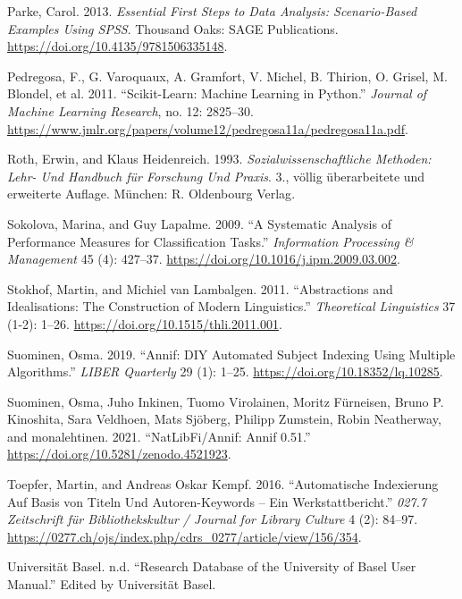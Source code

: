 \begin{CSLReferences}{1}{0}
\leavevmode\hypertarget{ref-Parke.2013}{}%
Parke, Carol. 2013. \emph{Essential First Steps to Data Analysis:
Scenario-Based Examples Using SPSS}. Thousand Oaks: {SAGE Publications}.
\url{https://doi.org/10.4135/9781506335148}.

\leavevmode\hypertarget{ref-Pedregosa.2011}{}%
Pedregosa, F., G. Varoquaux, A. Gramfort, V. Michel, B. Thirion, O.
Grisel, M. Blondel, et al. 2011. {``Scikit-Learn: Machine Learning in
Python.''} \emph{Journal of Machine Learning Research}, no. 12:
2825--30.
\url{https://www.jmlr.org/papers/volume12/pedregosa11a/pedregosa11a.pdf}.

\leavevmode\hypertarget{ref-Roth.1993}{}%
Roth, Erwin, and Klaus Heidenreich. 1993. \emph{Sozialwissenschaftliche
Methoden: Lehr- Und Handbuch f{ü}r Forschung Und Praxis}. 3., v{ö}llig
{ü}berarbeitete und erweiterte Auflage. M{ü}nchen: {R. Oldenbourg
Verlag}.

\leavevmode\hypertarget{ref-Sokolova.2009}{}%
Sokolova, Marina, and Guy Lapalme. 2009. {``A Systematic Analysis of
Performance Measures for Classification Tasks.''} \emph{Information
Processing {\&} Management} 45 (4): 427--37.
\url{https://doi.org/10.1016/j.ipm.2009.03.002}.

\leavevmode\hypertarget{ref-Stokhof.2011}{}%
Stokhof, Martin, and Michiel van Lambalgen. 2011. {``Abstractions and
Idealisations: The Construction of Modern Linguistics.''}
\emph{Theoretical Linguistics} 37 (1-2): 1--26.
\url{https://doi.org/10.1515/thli.2011.001}.

\leavevmode\hypertarget{ref-Suominen.2019}{}%
Suominen, Osma. 2019. {``Annif: DIY Automated Subject Indexing Using
Multiple Algorithms.''} \emph{LIBER Quarterly} 29 (1): 1--25.
\url{https://doi.org/10.18352/lq.10285}.

\leavevmode\hypertarget{ref-Suominen.2021}{}%
Suominen, Osma, Juho Inkinen, Tuomo Virolainen, Moritz Fürneisen, Bruno
P. Kinoshita, Sara Veldhoen, Mats Sjöberg, Philipp Zumstein, Robin
Neatherway, and monalehtinen. 2021. {``NatLibFi/Annif: Annif 0.51.''}
\url{https://doi.org/10.5281/zenodo.4521923}.

\leavevmode\hypertarget{ref-Toepfer.2016}{}%
Toepfer, Martin, and Andreas Oskar Kempf. 2016. {``Automatische
Indexierung Auf Basis von Titeln Und Autoren-Keywords -- Ein
Werkstattbericht.''} \emph{027.7 Zeitschrift f{ü}r Bibliothekskultur /
Journal for Library Culture} 4 (2): 84--97.
\url{https://0277.ch/ojs/index.php/cdrs_0277/article/view/156/354}.

\leavevmode\hypertarget{ref-UniversitatBasel.2021}{}%
Universität Basel. n.d. {``Research Database of the University of Basel
User Manual.''} Edited by Universität Basel.


\end{CSLReferences}
